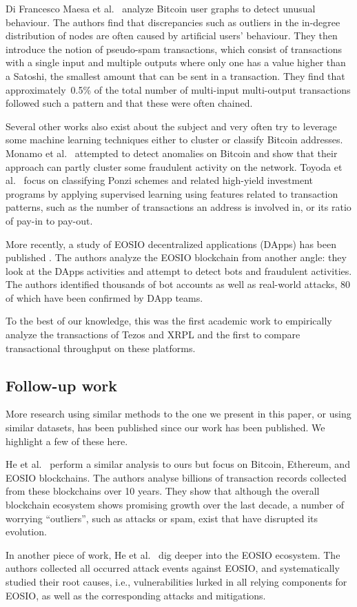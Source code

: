 Di Francesco Maesa et al.~\cite{10.1007/978-3-319-50901-3_59} analyze Bitcoin user graphs to detect unusual behaviour. The authors find that discrepancies such as outliers in the in-degree distribution of nodes are often caused by artificial users' behaviour. They then introduce the notion of pseudo-spam transactions, which consist of transactions with a single input and multiple outputs where only one has a value higher than a Satoshi, the smallest amount that can be sent in a transaction. They find that approximately~0.5\% of the total number of multi-input multi-output transactions followed such a pattern and that these were often chained.

Several other works also exist about the subject and very often try to leverage some machine learning techniques either to cluster or classify Bitcoin addresses. Monamo et al.~\cite{7802939} attempted to detect anomalies on Bitcoin and show that their approach can partly cluster some fraudulent activity on the network. Toyoda et al.~\cite{8254420} focus on classifying Ponzi schemes and related high-yield investment programs by applying supervised learning using features related to transaction patterns, such as the number of transactions an address is involved in, or its ratio of pay-in to pay-out.

More recently, a study of EOSIO decentralized applications (DApps) has been published \cite{huang2020characterizing}.
The authors analyze the EOSIO blockchain from another angle: they look at the DApps activities and attempt to detect bots and fraudulent activities.
The authors identified thousands of bot accounts as well as real-world attacks, 80 of which have been confirmed by DApp teams.

To the best of our knowledge, this was the first academic work to empirically analyze the transactions of Tezos and XRPL and the first to compare transactional throughput on these platforms.

\subsection{Follow-up work}
More research using similar methods to the one we present in this paper, or using similar datasets, has been published since our work has been published.
We highlight a few of these here.

He et al.~\cite{He2021UnderstandingTE} perform a similar analysis to ours but focus on Bitcoin, Ethereum, and EOSIO blockchains.
The authors analyse billions of transaction records collected from these blockchains over 10 years.
They show that although the overall blockchain ecosystem shows promising growth over the last decade, a number of worrying ``outliers'', such as attacks or spam, exist that have disrupted its evolution.

In another piece of work, He et al.~\cite{He2022ASO} dig deeper into the EOSIO ecosystem.
The authors collected all occurred attack events against EOSIO, and systematically studied their root causes, i.e., vulnerabilities lurked in all relying components for EOSIO, as well as the corresponding attacks and mitigations.
